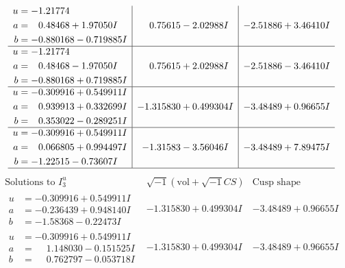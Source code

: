 \documentclass[1p]{elsarticle_modified}
\theoremstyle{definition}
\newcommand{\I}{\sqrt{-1}}
\begin{document}
$$\begin{array}{c|c|c}
\begin{aligned}
u &= -1.21774\phantom{ +0.000000I} \\
a &= \phantom{-}0.48468 + 1.97050 I \\
b &= -0.880168 - 0.719885 I\end{aligned}
 & \phantom{-}0.75615 - 2.02988 I & -2.51886 + 3.46410 I \\ \hline\begin{aligned}
u &= -1.21774\phantom{ +0.000000I} \\
a &= \phantom{-}0.48468 - 1.97050 I \\
b &= -0.880168 + 0.719885 I\end{aligned}
 & \phantom{-}0.75615 + 2.02988 I & -2.51886 - 3.46410 I \\ \hline\begin{aligned}
u &= -0.309916 + 0.549911 I \\
a &= \phantom{-}0.939913 + 0.332699 I \\
b &= \phantom{-}0.353022 - 0.289251 I\end{aligned}
 & -1.315830 + 0.499304 I & -3.48489 + 0.96655 I \\ \hline\begin{aligned}
u &= -0.309916 + 0.549911 I \\
a &= \phantom{-}0.066805 + 0.994497 I \\
b &= -1.22515 - 0.73607 I\end{aligned}
 & -1.31583 - 3.56046 I & -3.48489 + 7.89475 I\\
 \hline 
 \end{array}$$\newpage$$\begin{array}{c|c|c}  
\text{Solutions to }I^u_{3}& \I (\text{vol} + \sqrt{-1}CS) & \text{Cusp shape}\\
 \hline 
\begin{aligned}
u &= -0.309916 + 0.549911 I \\
a &= -0.236439 + 0.948140 I \\
b &= -1.58368 - 0.22473 I\end{aligned}
 & -1.315830 + 0.499304 I & -3.48489 + 0.96655 I \\ \hline\begin{aligned}
u &= -0.309916 + 0.549911 I \\
a &= \phantom{-}1.148030 - 0.151525 I \\
b &= \phantom{-}0.762797 - 0.053718 I\end{aligned}
 & -1.315830 + 0.499304 I & -3.48489 + 0.96655 I \\ \hline\begin{aligned}

\end{aligned}
\end{array}$$
\end{document}
